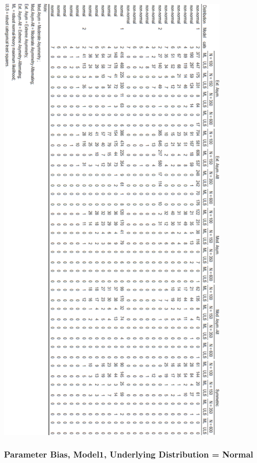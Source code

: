 \documentclass[10,a4paperpaper,]{article}
\begin{document}
\includegraphics[width=325pt]{./figures/tabA4_A5}

\subsubsection{Parameter Bias, Model1, Underlying Distribution = Normal}
\end{document}
